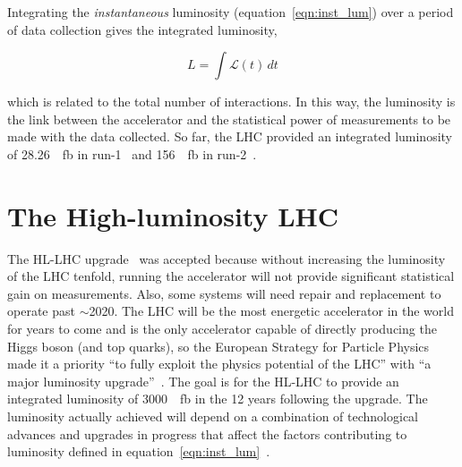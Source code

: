 Integrating the \textit{instantaneous} luminosity (equation~\ref{eqn:inst_lum}) over a period of data collection gives the integrated luminosity,

\begin{equation}
L = \int \mathcal{L} \left( t \right) \,dt
\label{eqn:int_lum}
\end{equation}

which is related to the total number of interactions. In this way, the luminosity is the link between the accelerator and the statistical power of measurements to be made with the data collected. So far, the LHC provided an integrated luminosity of \SI{28.26}{\per\femto\barn} in run-1~\cite{atlas_luminosity_run1} and \SI{156}{\per\femto\barn} in run-2~\cite{atlas_luminosity_run2}.

\section{The High-luminosity LHC}

The HL-LHC upgrade~\cite{hl_lhc_tdr} was accepted because without increasing the luminosity of the LHC tenfold, running the accelerator will not provide significant statistical gain on measurements. Also, some systems will need repair and replacement to operate past $\sim$2020. The LHC will be the most energetic accelerator in the world for years to come and is the only accelerator capable of directly producing the Higgs boson (and top quarks), so the European Strategy for Particle Physics made it a priority ``to fully exploit the physics potential of the LHC'' with ``a major luminosity upgrade''~\cite{european_strategy_for_particle_physics}. The goal is for the HL-LHC to provide an integrated luminosity of \SI{3000}{\per\femto\barn} in the 12 years following the upgrade. The luminosity actually achieved will depend on a combination of technological advances and upgrades in progress that affect the factors contributing to luminosity defined in equation~\ref{eqn:inst_lum}~\cite{hl_lhc_tdr}.

